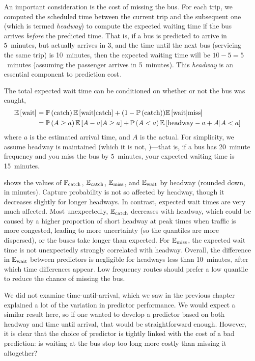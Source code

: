 An important consideration is the cost of missing the bus. For each trip, we computed the scheduled time between the current trip and the subsequent one (which is termed \emph{headway}) to compute the expected waiting time if the bus arrives \emph{before} the predicted time. That is, if a bus is predicted to arrive in 5~minutes, but actually arrives in 3, and the time until the next bus (servicing the same trip) is 10~minutes, then the expected waiting time will be $10-5=5$~minutes (assuming the passenger arrives in 5~minutes). This \emph{headway} is an essential component to prediction cost.

The total expected wait time can be conditioned on whether or not the bus was caught,
\begin{equation}
\label{eq:eta_wait_conditional}
\begin{split}
\mathbb{E}\left[\text{wait}\right] &=
  \mathbb{P}\left(\text{catch}\right) \mathbb{E}\left[\text{wait}|\text{catch}\right] +
  (1 - \mathbb{P}\left(\text{catch}\right)) \mathbb{E}\left[\text{wait}|\text{miss}\right] \\
  &= \mathbb{P}\left(A \geq a\right) \mathbb{E}\left[A - a | A \geq a\right] +
  \mathbb{P}\left(A < a\right)\mathbb{E}\left[\text{headway} - a + A | A < a\right]
\end{split}
\end{equation}
where $a$ is the estimated arrival time, and $A$ is the actual. For simplicity, we assume headway is maintained (which it is not, \citet{})---that is, if a bus has 20~minute frequency and you miss the bus by 5~minutes, your expected waiting time is 15~minutes.

 shows the values of $\mathbb{P}_\text{catch}$, $\mathbb{E}_\text{catch}$, $\mathbb{E}_\text{miss}$, and $\mathbb{E}_\text{wait}$ by headway (rounded down, in minutes). Capture probability is not so affected by headway, though it decreases slightly for longer headways. In contrast, expected wait times are very much affected. Most unexpectedly, $\mathbb{E}_\text{catch}$ decreases with headway, which could be caused by a higher proportion of short headway at peak times when traffic is more congested, leading to more uncertainty (so the quantiles are more dispersed), or the buses take longer than expected. For $\mathbb{E}_\text{miss}$, the expected wait time is not unexpectedly strongly correlated with headway. Overall, the difference in $\mathbb{E}_\text{wait}$ between predictors is negligible for headways less than 10~minutes, after which time differences appear. Low frequency routes should prefer a low quantile to reduce the chance of missing the bus.


We did not examine time-until-arrival, which we saw in the previous chapter explained a lot of the variation in predictor performance. We would expect a similar result here, so if one wanted to develop a predictor based on both headway and time until arrival, that would be straightforward enough. However, it is clear that the choice of predictor is tightly linked with the cost of a bad prediction: is waiting at the bus stop too long more costly than missing it altogether?

